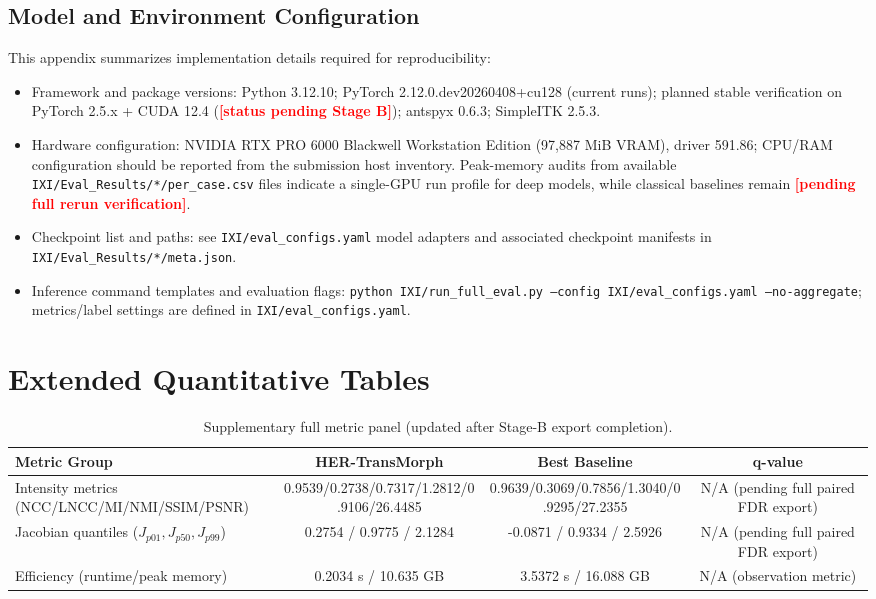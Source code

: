 \documentclass[jimaging,article,submit,pdftex,moreauthors]{Definitions/mdpi}
\providecommand{\PH}[1]{\textcolor{red}{\textbf{[#1]}}}
\begin{document}
\subsection[\appendixname~\thesubsection]{Model and Environment Configuration}
This appendix summarizes implementation details required for reproducibility:
\begin{itemize}
\item Framework and package versions: Python 3.12.10; PyTorch 2.12.0.dev20260408+cu128 (current runs); planned stable verification on PyTorch 2.5.x + CUDA 12.4 (\PH{status pending Stage B}); antspyx 0.6.3; SimpleITK 2.5.3.
\item Hardware configuration: NVIDIA RTX PRO 6000 Blackwell Workstation Edition (97,887 MiB VRAM), driver 591.86; CPU/RAM configuration should be reported from the submission host inventory. Peak-memory audits from available \texttt{IXI/Eval\_Results/*/per\_case.csv} files indicate a single-GPU run profile for deep models, while classical baselines remain \PH{pending full rerun verification}.
\item Checkpoint list and paths: see \texttt{IXI/eval\_configs.yaml} model adapters and associated checkpoint manifests in \texttt{IXI/Eval\_Results/*/meta.json}.
\item Inference command templates and evaluation flags: \texttt{python IXI/run\_full\_eval.py --config IXI/eval\_configs.yaml --no-aggregate}; metrics/label settings are defined in \texttt{IXI/eval\_configs.yaml}.
\end{itemize}

\section[\appendixname~\thesection]{Extended Quantitative Tables}
\begin{table}[H]
\caption{Supplementary full metric panel (updated after Stage-B export completion).\label{tab5}}
\begin{tabularx}{\textwidth}{lccc}
\toprule
\textbf{Metric Group} & \textbf{HER-TransMorph} & \textbf{Best Baseline} & \textbf{q-value}\\
\midrule
Intensity metrics (NCC/LNCC/MI/NMI/SSIM/PSNR) & 0.9539/0.2738/0.7317/1.2812/0.9106/26.4485 & 0.9639/0.3069/0.7856/1.3040/0.9295/27.2355 & N/A (pending full paired FDR export)\\
Jacobian quantiles (\(J_{p01},J_{p50},J_{p99}\)) & 0.2754 / 0.9775 / 2.1284 & -0.0871 / 0.9334 / 2.5926 & N/A (pending full paired FDR export)\\
Efficiency (runtime/peak memory) & 0.2034 s / 10.635 GB & 3.5372 s / 16.088 GB & N/A (observation metric)\\
\bottomrule
\end{tabularx}
\end{table}
\end{document}
